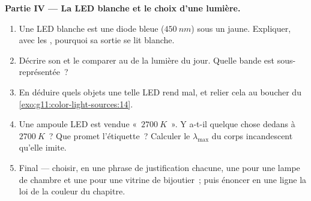 \begin{problem}
\medskip
\noindent\textbf{Partie IV --- La LED blanche et le choix d'une lumière.}
\begin{enumerate}[resume]
  \item Une LED blanche est une diode bleue ($\qty{450}{nm}$) sous un
         jaune. Expliquer, avec les
        ,
        pourquoi sa sortie se lit blanche.
  \item Décrire son  et le comparer au
         de la lumière du jour.
        Quelle bande est sous-représentée~?
  \item En déduire quels objets une telle LED rend mal, et relier cela
        au boucher du \cref{exo:g11:color-light-sources:14}.
  \item Une ampoule LED est vendue «~$\qty{2700}{K}$~». Y a-t-il quelque
        chose dedans à $\qty{2700}{K}$~? Que promet l'étiquette~?
        Calculer le $\lambda_{\max}$ du corps incandescent qu'elle
        imite.
  \item Final --- choisir, en une phrase de justification chacune, une
         pour une
        lampe de chambre et une pour une vitrine de bijoutier~; puis
        énoncer en une ligne la loi de la couleur du chapitre.
\end{enumerate}
\end{problem}
